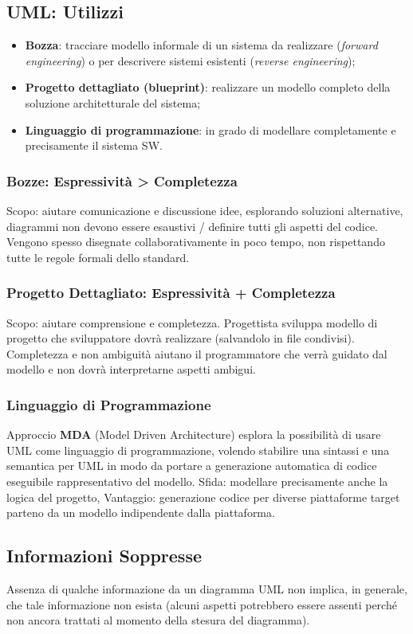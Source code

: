 \documentclass{article}
\begin{document}
    \subsection{UML: Utilizzi}
      \begin{itemize}
        \item \textbf{Bozza}: tracciare modello informale di un sistema da realizzare (\textit{forward engineering}) o per descrivere sistemi esistenti (\textit{reverse engineering});
        \item \textbf{Progetto dettagliato (blueprint)}: realizzare un modello completo della soluzione architetturale del sistema;
        \item \textbf{Linguaggio di programmazione}: in grado di modellare completamente e precisamente il sistema SW. 
      \end{itemize}
      \subsubsection{Bozze: Espressività > Completezza}
        Scopo: aiutare comunicazione e discussione idee, esplorando soluzioni alternative, diagrammi non devono essere esaustivi / definire tutti gli aspetti del codice. Vengono spesso disegnate collaborativamente in poco tempo, non rispettando tutte le regole formali dello standard. 
      \subsubsection{Progetto Dettagliato: Espressività + Completezza}
        Scopo: aiutare comprensione e completezza. Progettista sviluppa modello di progetto che sviluppatore dovrà realizzare (salvandolo in file condivisi). Completezza e non ambiguità aiutano il programmatore che verrà guidato dal modello e non dovrà interpretarne aspetti ambigui. 
      \subsubsection{Linguaggio di Programmazione}
        Approccio \textbf{MDA} (Model Driven Architecture) esplora la possibilità di usare UML come linguaggio di programmazione, volendo stabilire una sintassi e una semantica per UML in modo da portare a generazione automatica di codice eseguibile rappresentativo del modello. Sfida: modellare precisamente anche la logica del progetto, Vantaggio: generazione codice per diverse piattaforme target parteno da un modello indipendente dalla piattaforma.
    \subsection{Informazioni Soppresse}
      Assenza di qualche informazione da un diagramma UML non implica, in generale, che tale informazione non esista (alcuni aspetti potrebbero essere assenti perché non ancora trattati al momento della stesura del diagramma). 
\end{document}
